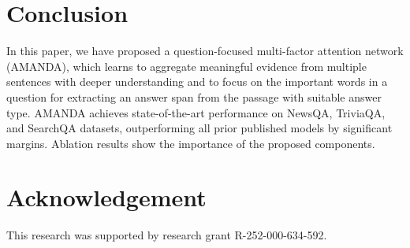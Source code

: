 \documentclass[letterpaper]{article} %
\begin{document}
\section{Conclusion}
In this paper, we have proposed a question-focused multi-factor attention network (AMANDA), which learns to aggregate meaningful evidence from multiple sentences with deeper understanding and to focus on the important words in a question for extracting an answer span from the passage with suitable answer type. AMANDA achieves state-of-the-art performance on NewsQA, TriviaQA, and SearchQA datasets, outperforming all prior published models by significant margins. Ablation results show the importance of the proposed components.
\section{Acknowledgement}
This research was supported by research grant R-252-000-634-592.
 

\end{document}
